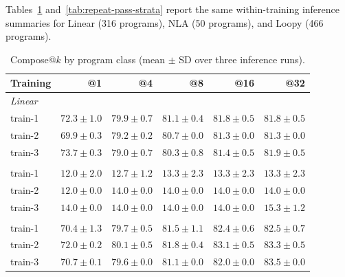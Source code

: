 \documentclass[10pt]{article}
\begin{document}
Tables~\ref{tab:repeat-compose-strata} and~\ref{tab:repeat-pass-strata}
report the same within-training inference summaries for Linear (316 programs),
NLA (50 programs), and Loopy (466 programs).

\begin{table}[H]
\centering
\begin{tabular}{lrrrrr}
\toprule
\rowcolor{headerbg}
Training & @1 & @4 & @8 & @16 & @32 \\
\midrule
\multicolumn{6}{l}{\textit{Linear}} \\
train-1 & \(72.3\pm1.0\) & \(79.9\pm0.7\) & \(81.1\pm0.4\) & \(81.8\pm0.5\) & \(81.8\pm0.5\) \\
train-2 & \(69.9\pm0.3\) & \(79.2\pm0.2\) & \(80.7\pm0.0\) & \(81.3\pm0.0\) & \(81.3\pm0.0\) \\
train-3 & \(73.7\pm0.3\) & \(79.0\pm0.7\) & \(80.3\pm0.8\) & \(81.4\pm0.5\) & \(81.9\pm0.5\) \\
\addlinespace
\multicolumn{6}{l}{\textit{NLA}} \\
train-1 & \(12.0\pm2.0\) & \(12.7\pm1.2\) & \(13.3\pm2.3\) & \(13.3\pm2.3\) & \(13.3\pm2.3\) \\
train-2 & \(12.0\pm0.0\) & \(14.0\pm0.0\) & \(14.0\pm0.0\) & \(14.0\pm0.0\) & \(14.0\pm0.0\) \\
train-3 & \(14.0\pm0.0\) & \(14.0\pm0.0\) & \(14.0\pm0.0\) & \(14.0\pm0.0\) & \(15.3\pm1.2\) \\
\addlinespace
\multicolumn{6}{l}{\textit{Loopy}} \\
train-1 & \(70.4\pm1.3\) & \(79.7\pm0.5\) & \(81.5\pm1.1\) & \(82.4\pm0.6\) & \(82.5\pm0.7\) \\
train-2 & \(72.0\pm0.2\) & \(80.1\pm0.5\) & \(81.8\pm0.4\) & \(83.1\pm0.5\) & \(83.3\pm0.5\) \\
train-3 & \(70.7\pm0.1\) & \(79.6\pm0.0\) & \(81.1\pm0.0\) & \(82.0\pm0.0\) & \(83.5\pm0.0\) \\
\bottomrule
\end{tabular}
\caption{Compose@\(k\) by program class (mean \(\pm\) SD over three inference runs).}
\label{tab:repeat-compose-strata}
\end{table}
\end{document}
